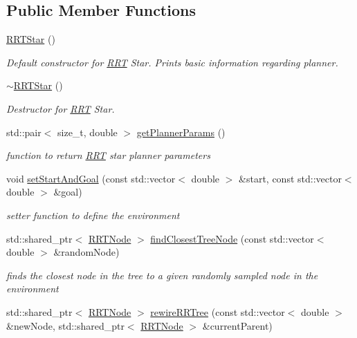 \subsection*{Public Member Functions}
\begin{DoxyCompactItemize}
\item 
\hyperlink{classRRTStar_aa3305dbcb77c5c47166fdfbc14817802}{R\+R\+T\+Star} ()
\begin{DoxyCompactList}\small\item\em Default constructor for \hyperlink{classRRT}{R\+RT} Star. Prints basic information regarding planner. \end{DoxyCompactList}\item 
\hyperlink{classRRTStar_adbaa4004aaff73307684524b9a3a8c27}{$\sim$\+R\+R\+T\+Star} ()
\begin{DoxyCompactList}\small\item\em Destructor for \hyperlink{classRRT}{R\+RT} Star. \end{DoxyCompactList}\item 
std\+::pair$<$ size\+\_\+t, double $>$ \hyperlink{classRRTStar_ae2b78463af6072b4f7efa5188a530d54}{get\+Planner\+Params} ()
\begin{DoxyCompactList}\small\item\em function to return \hyperlink{classRRT}{R\+RT} star planner parameters \end{DoxyCompactList}\item 
void \hyperlink{classRRTStar_a1205f9b17419186be4a575151e68f304}{set\+Start\+And\+Goal} (const std\+::vector$<$ double $>$ \&start, const std\+::vector$<$ double $>$ \&goal)
\begin{DoxyCompactList}\small\item\em setter function to define the environment \end{DoxyCompactList}\item 
std\+::shared\+\_\+ptr$<$ \hyperlink{classRRTNode}{R\+R\+T\+Node} $>$ \hyperlink{classRRTStar_ac8825e6654bc43d7d82918451e09ea89}{find\+Closest\+Tree\+Node} (const std\+::vector$<$ double $>$ \&random\+Node)
\begin{DoxyCompactList}\small\item\em finds the closest node in the tree to a given randomly sampled node in the environment \end{DoxyCompactList}\item 
std\+::shared\+\_\+ptr$<$ \hyperlink{classRRTNode}{R\+R\+T\+Node} $>$ \hyperlink{classRRTStar_a6758b1eeb5b6d2f883d710a9bf8d2387}{rewire\+R\+R\+Tree} (const std\+::vector$<$ double $>$ \&new\+Node, std\+::shared\+\_\+ptr$<$ \hyperlink{classRRTNode}{R\+R\+T\+Node} $>$ \&current\+Parent)

\end{DoxyCompactItemize}
